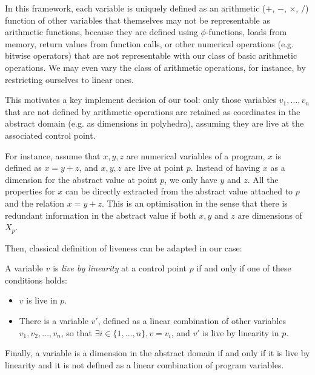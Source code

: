 \documentclass{entcs}
\begin{document}
In this framework, each variable is uniquely defined as an arithmetic ($+$, $-$, $\times$, $/$) function of other variables that themselves may not be representable as arithmetic functions, because they are defined using $\phi$-functions, loads from memory, return values from function calls, or other numerical operations (e.g. bitwise operators) that are not representable with our class of basic arithmetic operations. We may even vary the class of arithmetic operations, for instance, by restricting ourselves to linear ones.

This motivates a key implement decision of our tool: only those variables
$v_1,\dots,v_n$ that are not defined by arithmetic operations are retained as
coordinates in the abstract domain (e.g. as dimensions in polyhedra), assuming
they are live at the associated control point. 

	For instance, assume that $x,y,z$ are numerical variables of a program,
	$x$ is defined as $x = y+z$, and $x,y,z$ are live at point $p$. Instead of having
	$x$ as a dimension for the abstract value at point $p$, we only have $y$ and $z$. All the properties
	for $x$ can be directly extracted from the abstract value attached to $p$ and the relation $x=y+z$.
	This is an optimisation in the sense that there is redundant information in
	the abstract value if both $x,y$ and $z$ are dimensions of $X_p$.

	Then, classical definition of liveness can be adapted in our case:

	\begin{definition}
	A variable $v$ is \emph{live by linearity} at a control point $p$ if and
	only if one of these conditions holds:
		\begin{itemize}
		\item $v$ is live in $p$.
		\item There is a variable $v'$, defined as a linear combination of other
		variables $v_1, v_2, \dots, v_n$, so that $\exists i \in \{1,\dots,n\}, v = v_i$,
		and $v'$ is live by linearity in $p$.
		\end{itemize}
	\end{definition}

	Finally, a variable is a dimension in the abstract domain if and only if it
	is live by linearity and it is not defined as a linear combination of
	program variables.
\end{document}
